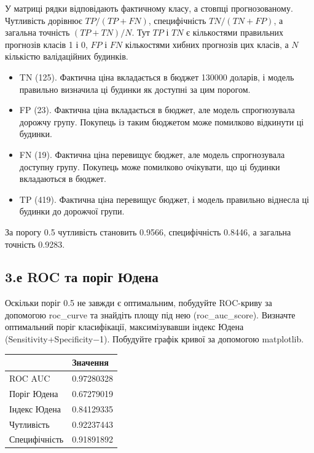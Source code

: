 \answerheading
У матриці рядки відповідають фактичному класу, а стовпці прогнозованому.
Чутливість дорівнює \(TP/(TP+FN)\), специфічність \(TN/(TN+FP)\), а
загальна точність \((TP+TN)/N\). Тут \(TP\) і \(TN\) є кількостями
правильних прогнозів класів 1 і 0, \(FP\) і \(FN\) кількостями хибних
прогнозів цих класів, а \(N\) кількістю валідаційних будинків.

\begin{itemize}
\item
  TN (125). Фактична ціна вкладається в бюджет 130000 доларів, і модель
  правильно визначила ці будинки як доступні за цим порогом.
\item
  FP (23). Фактична ціна вкладається в бюджет, але модель спрогнозувала
  дорожчу групу. Покупець із таким бюджетом може помилково відкинути ці
  будинки.
\item
  FN (19). Фактична ціна перевищує бюджет, але модель спрогнозувала
  доступну групу. Покупець може помилково очікувати, що ці будинки
  вкладаються в бюджет.
\item
  TP (419). Фактична ціна перевищує бюджет, і модель правильно віднесла
  ці будинки до дорожчої групи.
\end{itemize}

За порогу 0.5 чутливість становить 0.9566, специфічність 0.8446, а
загальна точність 0.9283.


\Needspace{266pt}

\subsection{3.е ROC та поріг Юдена}

\begin{taskstatement}Оскільки поріг 0.5 не завжди є оптимальним, побудуйте ROC-криву за
допомогою roc\_curve та знайдіть площу під нею (roc\_auc\_score).
Визначте оптимальний поріг класифікації, максимізувавши індекс Юдена
(Sensitivity+Specificity−1). Побудуйте графік кривої за допомогою
matplotlib.
\end{taskstatement}


\Needspace{95pt}
\begingroup\fontsize{7.5}{9.5}\selectfont\setlength{\tabcolsep}{2.5mm}\renewcommand{\arraystretch}{1.12}\par\noindent\begin{tabular}{|ll|}
\hline
 & Значення \\
\hline
ROC AUC & 0.97280328 \\
Поріг Юдена & 0.67279019 \\
Індекс Юдена & 0.84129335 \\
Чутливість & 0.92237443 \\
Специфічність & 0.91891892 \\
\hline
\end{tabular}
\par\endgroup


